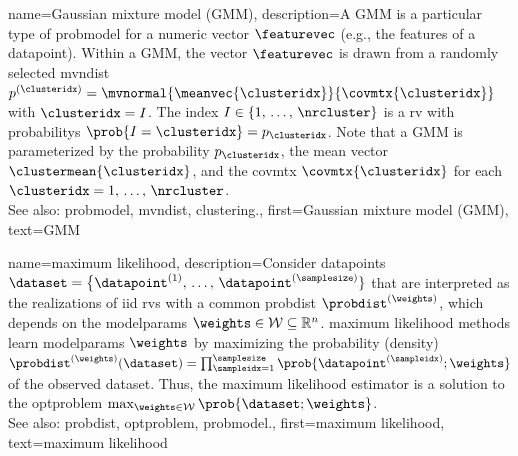 {name={Gaussian mixture model (GMM)}, 
	description={A GMM 
		is a particular type of \gls{probmodel} for a numeric \gls{vector} $\featurevec$ (e.g., 
		the \glspl{feature} of a \gls{datapoint}). Within a GMM, the \gls{vector} $\featurevec$ 
		is drawn from a randomly selected \gls{mvndist} 
		$p^{(\clusteridx)} = \mvnormal{\meanvec{\clusteridx}}{\covmtx{\clusteridx}}$ with 
		$\clusteridx = I$. The index $I \in \{1, \,\ldots, \,\nrcluster\}$ is a \gls{rv} with 
		\glspl{probability} $\prob{I=\clusteridx} = p_{\clusteridx}$.
	     	Note that a GMM is parameterized by the \gls{probability} $p_{\clusteridx}$, the 
		\gls{mean} \gls{vector} $\clustermean{\clusteridx}$, and the \gls{covmtx} $\covmtx{\clusteridx}$ 
		for each $\clusteridx=1, \,\ldots, \,\nrcluster$. 
				\\
		See also: \gls{probmodel}, \gls{mvndist}, \gls{clustering}.},
	first={Gaussian mixture model (GMM)},
	text={GMM} 
}
 
{name={maximum likelihood}, 
	description={Consider \glspl{datapoint} 
	$\dataset=\big\{ \datapoint^{(1)}, \,\ldots, \,\datapoint^{(\samplesize)} \}$ 
	that are interpreted as the \glspl{realization} of \gls{iid} \glspl{rv} 
	with a common \gls{probdist} $\probdist^{(\weights)}$, which depends 
	on the \glspl{modelparam} $\weights \in \mathcal{W} \subseteq \mathbb{R}^{n}$. 
		\Gls{maximum} likelihood methods learn \glspl{modelparam} $\weights$ by maximizing 
		the probability (density) $\probdist^{(\weights)}(\dataset) = \prod_{\sampleidx=1}^{\samplesize} \prob{\datapoint^{(\sampleidx)}; \weights}$ 
		of the observed \gls{dataset}. Thus, the \gls{maximum} likelihood estimator is a 
		solution to the \gls{optproblem} $\max_{\weights \in \mathcal{W}} \prob{\dataset; \weights}$.
				\\
		See also: \gls{probdist}, \gls{optproblem}, \gls{probmodel}.},
	first={maximum likelihood},
	text={maximum likelihood}
}


